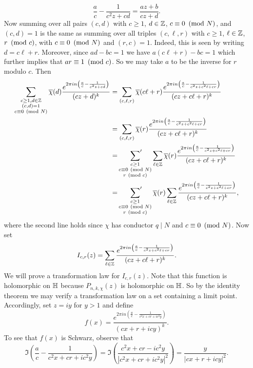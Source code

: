     \[
      \frac{a}{c}-\frac{1}{c^{2}z+cd} = \frac{az+b}{cz+d}.
    \]
    Now summing over all pairs $(c,d)$ with $c \ge 1$, $d \in \mathbb{Z}$, $c \equiv 0 \ \left(\text{mod }N\right)$, and $(c,d) = 1$ is the same as summing over all triples $(c,\ell,r)$ with $c \ge 1$, $\ell \in \mathbb{Z}$, $r \ \left(\text{mod }c\right)$, with $c \equiv 0 \ \left(\text{mod }N\right)$ and $(r,c) = 1$. Indeed, this is seen by writing $d = c\ell+r$. Moreover, since $ad-bc = 1$ we have $a(c\ell+r)-bc = 1$ which further implies that $ar \equiv 1 \ \left(\text{mod }c\right)$. So we may take $a$ to be the inverse for $r$ modulo $c$. Then
    \begin{align*}
      \sum_{\substack{c \ge 1,d \in \mathbb{Z} \\ (c,d) = 1 \\ c \equiv 0 \ \left(\text{mod }N\right)}}\overline{\chi}(d)\frac{e^{2\pi in\left(\frac{a}{c}-\frac{1}{c^{2}z+cd}\right)}}{(cz+d)^{k}} &= \sum_{(c,\ell,r)}\overline{\chi}(c\ell+r)\frac{e^{2\pi in\left(\frac{a}{c}-\frac{1}{c^{2}z+c^{2}\ell+cr}\right)}}{(cz+c\ell+r)^{k}} \\
      &= \sum_{(c,\ell,r)}\overline{\chi}(r)\frac{e^{2\pi in\left(\frac{a}{c}-\frac{1}{c^{2}z+c^{2}\ell+cr}\right)}}{(cz+c\ell+r)^{k}} \\
      &= \sideset{}{'}\sum_{\substack{c \ge 1 \\ c \equiv 0 \ \left(\text{mod }N\right) \\ r \ \left(\text{mod }c\right)}}\sum_{\ell \in \mathbb{Z}}\overline{\chi}(r)\frac{e^{2\pi in\left(\frac{a}{c}-\frac{1}{c^{2}z+c^{2}\ell+cr}\right)}}{(cz+c\ell+r)^{k}} \\
      &= \sideset{}{'}\sum_{\substack{c \ge 1 \\ c \equiv 0 \ \left(\text{mod }N\right) \\ r \ \left(\text{mod }c\right)}}\overline{\chi}(r)\sum_{\ell \in \mathbb{Z}}\frac{e^{2\pi in\left(\frac{a}{c}-\frac{1}{c^{2}z+c^{2}\ell+cr}\right)}}{(cz+c\ell+r)^{k}},
    \end{align*}
    where the second line holds since $\chi$ has conductor $q \mid N$ and $c \equiv 0 \ \left(\text{mod }N\right)$. Now set
    \[
      I_{c,r}(z) = \sum_{\ell \in \mathbb{Z}}\frac{e^{2\pi in\left(\frac{a}{c}-\frac{1}{c^{2}z+c^{2}\ell+cr}\right)}}{(cz+c\ell+r)^{k}}.
    \]
    We will prove a transformation law for $I_{c,r}(z)$. Note that this function is holomorphic on $\mathbb{H}$ because $P_{n,k,\chi}(z)$ is holomorphic on $\mathbb{H}$. So by the identity theorem we may verify a transformation law on a set containing a limit point. Accordingly, set $z = iy$ for $y > 1$ and define
    \[
      f(x) = \frac{e^{2\pi in\left(\frac{a}{c}-\frac{1}{c^{2}x+cr+ic^{2}y}\right)}}{(cx+r+icy)^{k}}.
    \]
    To see that $f(x)$ is Schwarz, observe that
    \begin{equation}\label{equ:imaginary_bound_for_Poincare_series}
      \Im\left(\frac{a}{c}-\frac{1}{c^{2}x+cr+ic^{2}y}\right) = \Im\left(\frac{c^{2}x+cr-ic^{2}y}{|c^{2}x+cr+ic^{2}y|^{2}}\right) = \frac{y}{|cx+r+icy|^{2}}.
    \end{equation}
